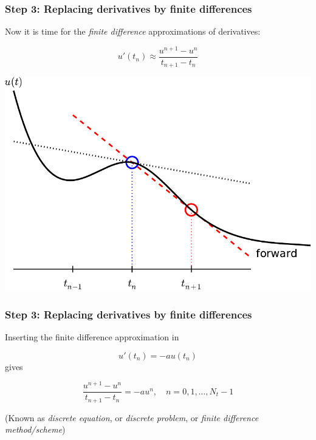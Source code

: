 \documentclass{beamer}
\begin{document}
\begin{frame}
\frametitle{Step 3: Replacing derivatives by finite differences}

Now it is time for the \emph{finite difference} approximations of
derivatives:

\begin{equation}
u'(t_n) \approx \frac{u^{n+1}-u^{n}}{t_{n+1}-t_n}
\label{decay:FEdiff}
\end{equation}



\centerline{\includegraphics[width=0.8\linewidth]{fig-alg/fd_forward.pdf}}
\end{frame}

\begin{frame}
\frametitle{Step 3: Replacing derivatives by finite differences}

Inserting the finite difference approximation in

\[ u'(t_n) = -au(t_n)\]
gives

\begin{equation}
\frac{u^{n+1}-u^{n}}{t_{n+1}-t_n} = -au^{n},\quad n=0,1,\ldots,N_t-1
\label{decay:step3}
\end{equation}

(Known as \emph{discrete equation}, or \emph{discrete problem},
or \emph{finite difference method/scheme})
\end{frame}
\end{document}
